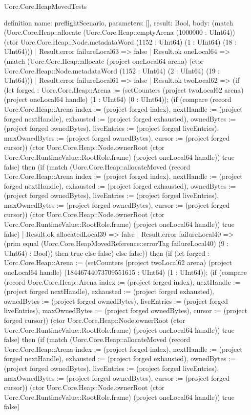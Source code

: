\begin{lexlean}{Uorc.Core.HeapMovedTests}
\begin{semanticmodule}
definition{
  name: preflightScenario,
  parameters: [],
  result: Bool,
  body: (match (Uorc.Core.Heap::allocate (Uorc.Core.Heap::emptyArena (1000000 : UInt64)) (ctor Uorc.Core.Heap::Node.metadataWord (1152 : UInt64) (1 : UInt64) (18 : UInt64)))
    | Result.error failureLocal63 => false
    | Result.ok oneLocal64 => (match (Uorc.Core.Heap::allocate (project oneLocal64 arena) (ctor Uorc.Core.Heap::Node.metadataWord (1152 : UInt64) (2 : UInt64) (19 : UInt64)))
      | Result.error failureLocal61 => false
      | Result.ok twoLocal62 => (if (let forged : Uorc.Core.Heap::Arena := (setCounters (project twoLocal62 arena) (project oneLocal64 handle) (1 : UInt64) (0 : UInt64)); (if (compare (record Uorc.Core.Heap::Arena {index := (project forged index), nextHandle := (project forged nextHandle), exhausted := (project forged exhausted), ownedBytes := (project forged ownedBytes), liveEntries := (project forged liveEntries), maxOwnedBytes := (project forged ownedBytes), cursor := (project forged cursor)}) (ctor Uorc.Core.Heap::Node.ownerRoot (ctor Uorc.Core.RuntimeValue::RootRole.frame) (project oneLocal64 handle)) true false) then (if (match (Uorc.Core.Heap::allocateMoved (record Uorc.Core.Heap::Arena {index := (project forged index), nextHandle := (project forged nextHandle), exhausted := (project forged exhausted), ownedBytes := (project forged ownedBytes), liveEntries := (project forged liveEntries), maxOwnedBytes := (project forged ownedBytes), cursor := (project forged cursor)}) (ctor Uorc.Core.Heap::Node.ownerRoot (ctor Uorc.Core.RuntimeValue::RootRole.frame) (project oneLocal64 handle)) true false)
        | Result.ok allocatedLocal39 => false
        | Result.error failureLocal40 => (prim equal (Uorc.Core.HeapMovedReference::errorTag failureLocal40) (9 : UInt64) : Bool)) then true else false) else false)) then (if (let forged : Uorc.Core.Heap::Arena := (setCounters (project twoLocal62 arena) (project oneLocal64 handle) (18446744073709551615 : UInt64) (1 : UInt64)); (if (compare (record Uorc.Core.Heap::Arena {index := (project forged index), nextHandle := (project forged nextHandle), exhausted := (project forged exhausted), ownedBytes := (project forged ownedBytes), liveEntries := (project forged liveEntries), maxOwnedBytes := (project forged ownedBytes), cursor := (project forged cursor)}) (ctor Uorc.Core.Heap::Node.ownerRoot (ctor Uorc.Core.RuntimeValue::RootRole.frame) (project oneLocal64 handle)) true false) then (if (match (Uorc.Core.Heap::allocateMoved (record Uorc.Core.Heap::Arena {index := (project forged index), nextHandle := (project forged nextHandle), exhausted := (project forged exhausted), ownedBytes := (project forged ownedBytes), liveEntries := (project forged liveEntries), maxOwnedBytes := (project forged ownedBytes), cursor := (project forged cursor)}) (ctor Uorc.Core.Heap::Node.ownerRoot (ctor Uorc.Core.RuntimeValue::RootRole.frame) (project oneLocal64 handle)) true false)
}
\end{semanticmodule}
\end{lexlean}
